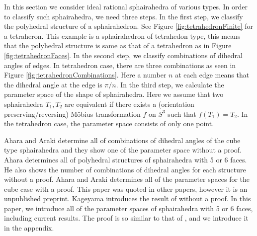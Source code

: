 \documentclass[suppldata, dvipdfmx]{interact}
\theoremstyle{plain}%
\theoremstyle{definition}
\theoremstyle{remark}
\theoremstyle{problemstyle}
\newtheorem{problem}{Problem}[section] %
\begin{document}


In this section we consider ideal rational sphairahedra of various types. 
In order to classify such sphairahedra, we need three steps.  In the first step, we classify the polyhedral structure of a sphairahedron.  See Figure \ref{fig:tetrahedronFinite} for a tetraheron.  This example is a sphairahedron of tetrahedon type, this means that the polyhedral structure is same as that of a tetrahedron as in Figure \ref{fig:tetrahedronFaces}.  
In the second step, we classify combinations of dihedral angles of edges.  In tetrahedron case, there are three combinations as seen in Figure \ref{fig:tetrahedronCombinations}.  Here a number $n$ at each edge means that the dihedral angle at the edge is $\pi / n$. 
In the third step, we calculate the parameter space of the shape of sphairahedra.  Here we assume that two sphairahedra $T_1, T_2$ are equivalent if there exists a (orientation preserving/reversing) M\"obius transformation $f$ on $S^3$ such that $f(T_1) = T_2$.  In the tetrahedron case, the parameter space consists of only one point.  

Ahara and Araki \cite{AharaAraki} determine all of combinations of dihedral angles of the cube type sphairahedra and they show one of the parameter space without a proof.  
Ahara \cite{AharaJa} determines all of polyhedral structures of sphairahedra with 5 or 6 faces.  He also shows the number of combinations of dihedral angles for each structure without a proof.  
Ahara and Araki \cite{AharaAraki2} determines all of the parameter spaces for the cube case with a proof.  This paper was quoted in other papers, however it is an unpublished preprint.
Kageyama \cite{kageyama} introduces the result of \cite{AharaAraki2} without a proof. 
In this paper, we introduce all of the parameter spaces of sphairahedra with 5 or 6 faces, including current results. The proof is so similar to that of \cite{AharaAraki2}, and we introduce it in the appendix.
\end{document}
